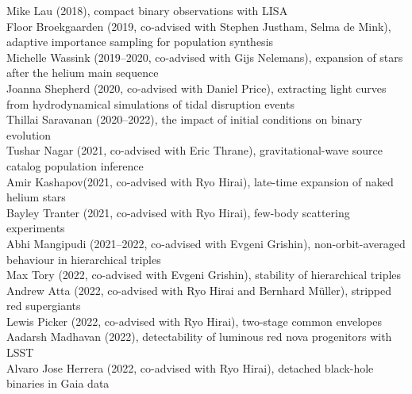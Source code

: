 \documentclass[margin,line]{res}
\begin{document}
\begin{resume}
Mike Lau (2018), compact binary observations with LISA\\
Floor Broekgaarden (2019, co-advised with Stephen Justham, Selma de Mink), adaptive importance sampling for population synthesis\\
Michelle Wassink (2019--2020, co-advised with Gijs Nelemans), expansion of stars after the helium main sequence\\
Joanna Shepherd (2020, co-advised with Daniel Price), extracting light curves from hydrodynamical simulations of tidal disruption events\\
Thillai Saravanan (2020--2022), the impact of initial conditions on binary evolution\\
Tushar Nagar (2021, co-advised with Eric Thrane), gravitational-wave source catalog population inference\\
Amir Kashapov(2021, co-advised with Ryo Hirai), late-time expansion of naked helium stars\\
Bayley Tranter (2021, co-advised with Ryo Hirai), few-body scattering experiments\\
Abhi Mangipudi (2021--2022, co-advised with Evgeni Grishin), non-orbit-averaged behaviour in hierarchical triples\\ 
Max Tory (2022, co-advised with Evgeni Grishin), stability of hierarchical triples\\
Andrew Atta (2022, co-advised with Ryo Hirai and Bernhard M\"{u}ller), stripped red supergiants\\
Lewis Picker (2022, co-advised with Ryo Hirai), two-stage common envelopes\\
Aadarsh Madhavan (2022), detectability of luminous red nova progenitors with LSST\\
Alvaro Jose Herrera (2022, co-advised with Ryo Hirai), detached black-hole binaries in Gaia data\\

 




\end{resume}
\end{document}
